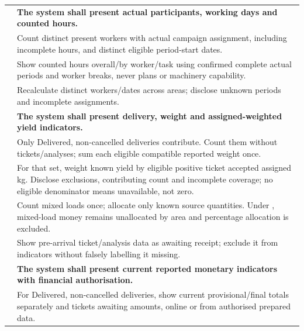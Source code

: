 {\begin{longtable}{L{0.18}L{0.82}}
\midrule
{}
\label{fr:057}\textbf{} & \textbf{The system shall present actual participants, working days and counted hours.}\\*
\label{ac:057:a} & Count distinct present workers with actual campaign assignment, including incomplete hours, and distinct eligible period-start dates.\\
\label{ac:057:b} & Show counted hours overall/by worker/task using confirmed complete actual periods and worker breaks, never plans or machinery capability.\\
\label{ac:057:c} & Recalculate distinct workers/dates across areas; disclose unknown periods and incomplete assignments.\\
\midrule
{}
\label{fr:058}\textbf{} & \textbf{The system shall present delivery, weight and assigned-weighted yield indicators.}\\*
\label{ac:058:a} & Only Delivered, non-cancelled deliveries contribute. Count them without tickets/analyses; sum each eligible compatible reported weight once.\\
\label{ac:058:b} & For that set, weight known yield by eligible positive ticket accepted assigned kg. Disclose exclusions, contributing count and incomplete coverage; no eligible denominator means unavailable, not zero.\\
\label{ac:058:c} & Count mixed loads once; allocate only known source quantities. Under , mixed-load money remains unallocated by area and percentage allocation is excluded.\\
\label{ac:058:d} & Show pre-arrival ticket/analysis data as awaiting receipt; exclude it from indicators without falsely labelling it missing.\\
\midrule
{}
\label{fr:059}\textbf{} & \textbf{The system shall present current reported monetary indicators with financial authorisation.}\\*
\label{ac:059:a} & For Delivered, non-cancelled deliveries, show current provisional/final totals separately and tickets awaiting amounts, online or from authorised prepared data.\\

\end{longtable}}
